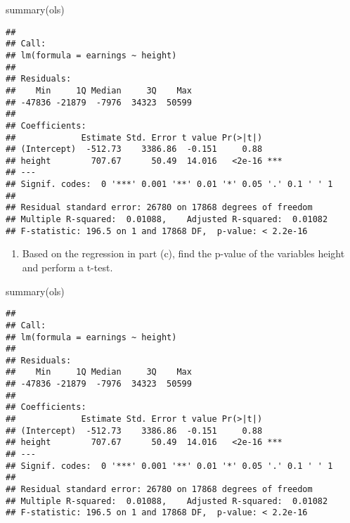 \documentclass[
]{article}
\newenvironment{Shaded}{\begin{snugshade}}{\end{snugshade}}
\newcommand{\CommentTok}[1]{\textcolor[rgb]{0.56,0.35,0.01}{\textit{#1}}}
\newcommand{\FunctionTok}[1]{\textcolor[rgb]{0.00,0.00,0.00}{#1}}
\newcommand{\NormalTok}[1]{#1}
\providecommand{\tightlist}{%
  \setlength{\itemsep}{0pt}\setlength{\parskip}{0pt}}
\begin{document}
\begin{Shaded}
\begin{Highlighting}[]
\FunctionTok{summary}\NormalTok{(ols)}
\end{Highlighting}
\end{Shaded}

\begin{verbatim}
## 
## Call:
## lm(formula = earnings ~ height)
## 
## Residuals:
##    Min     1Q Median     3Q    Max 
## -47836 -21879  -7976  34323  50599 
## 
## Coefficients:
##             Estimate Std. Error t value Pr(>|t|)    
## (Intercept)  -512.73    3386.86  -0.151     0.88    
## height        707.67      50.49  14.016   <2e-16 ***
## ---
## Signif. codes:  0 '***' 0.001 '**' 0.01 '*' 0.05 '.' 0.1 ' ' 1
## 
## Residual standard error: 26780 on 17868 degrees of freedom
## Multiple R-squared:  0.01088,    Adjusted R-squared:  0.01082 
## F-statistic: 196.5 on 1 and 17868 DF,  p-value: < 2.2e-16
\end{verbatim}

\begin{Shaded}
\end{Shaded}

\begin{enumerate}
\def\labelenumi{\alph{enumi})}
\setcounter{enumi}{7}
\tightlist
\item
  Based on the regression in part (c), find the p-value of the variables
  height and perform a t-test.
\end{enumerate}

\begin{Shaded}
\begin{Highlighting}[]
\FunctionTok{summary}\NormalTok{(ols)}
\end{Highlighting}
\end{Shaded}

\begin{verbatim}
## 
## Call:
## lm(formula = earnings ~ height)
## 
## Residuals:
##    Min     1Q Median     3Q    Max 
## -47836 -21879  -7976  34323  50599 
## 
## Coefficients:
##             Estimate Std. Error t value Pr(>|t|)    
## (Intercept)  -512.73    3386.86  -0.151     0.88    
## height        707.67      50.49  14.016   <2e-16 ***
## ---
## Signif. codes:  0 '***' 0.001 '**' 0.01 '*' 0.05 '.' 0.1 ' ' 1
## 
## Residual standard error: 26780 on 17868 degrees of freedom
## Multiple R-squared:  0.01088,    Adjusted R-squared:  0.01082 
## F-statistic: 196.5 on 1 and 17868 DF,  p-value: < 2.2e-16
\end{verbatim}
\end{document}
